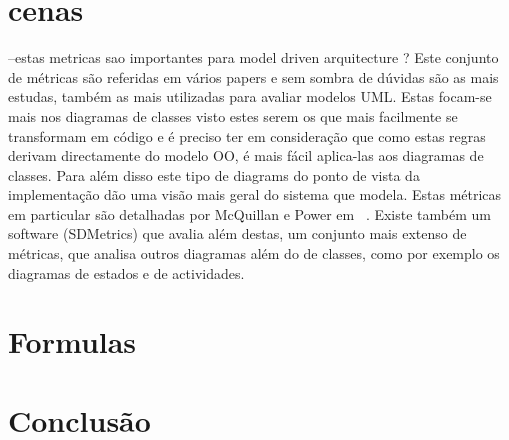\documentclass[10pt]{article}
\begin{document}
\section{cenas}
--estas metricas sao importantes para model driven arquitecture ?
Este conjunto de métricas são referidas em vários papers e sem sombra de dúvidas são as mais estudas, também as mais utilizadas para avaliar modelos UML.
Estas focam-se mais nos diagramas de classes visto estes serem os que mais facilmente se transformam em código e é preciso ter
em consideração que como estas regras derivam directamente do modelo OO, é mais fácil aplica-las
aos diagramas de classes. Para além disso este tipo de diagrams do ponto de vista da implementação dão uma visão mais geral do sistema que modela.
Estas métricas em particular são detalhadas por McQuillan e Power em ~\cite{Power}. Existe também um software (SDMetrics) que avalia além destas, um conjunto mais extenso de métricas, que analisa outros diagramas além do de classes, como por exemplo os diagramas de estados e de actividades.

\section{Formulas}


\section{Conclusão}

{}

\end{document}
